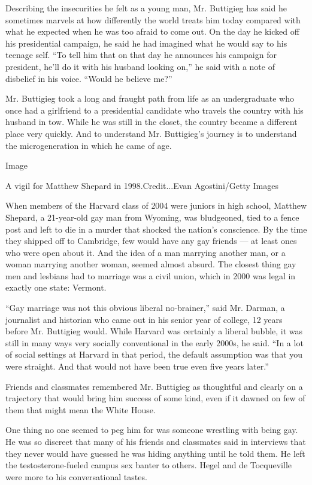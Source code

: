 Describing the insecurities he felt as a young man, Mr. Buttigieg has
said he sometimes marvels at how differently the world treats him today
compared with what he expected when he was too afraid to come out. On
the day he kicked off his presidential campaign, he said he had imagined
what he would say to his teenage self. ``To tell him that on that day he
announces his campaign for president, he'll do it with his husband
looking on,'' he said with a note of disbelief in his voice. ``Would he
believe me?''

Mr. Buttigieg took a long and fraught path from life as an undergraduate
who once had a girlfriend to a presidential candidate who travels the
country with his husband in tow. While he was still in the closet, the
country became a different place very quickly. And to understand Mr.
Buttigieg's journey is to understand the microgeneration in which he
came of age.

Image

A vigil for Matthew Shepard in 1998.Credit...Evan Agostini/Getty Images

When members of the Harvard class of 2004 were juniors in high school,
Matthew Shepard, a 21-year-old gay man from Wyoming, was bludgeoned,
tied to a fence post and left to die in a murder that shocked the
nation's conscience. By the time they shipped off to Cambridge, few
would have any gay friends --- at least ones who were open about it. And
the idea of a man marrying another man, or a woman marrying another
woman, seemed almost absurd. The closest thing gay men and lesbians had
to marriage was a civil union, which in 2000 was legal in exactly one
state: Vermont.

``Gay marriage was not this obvious liberal no-brainer,'' said Mr.
Darman, a journalist and historian who came out in his senior year of
college, 12 years before Mr. Buttigieg would. While Harvard was
certainly a liberal bubble, it was still in many ways very socially
conventional in the early 2000s, he said. ``In a lot of social settings
at Harvard in that period, the default assumption was that you were
straight. And that would not have been true even five years later.''

Friends and classmates remembered Mr. Buttigieg as thoughtful and
clearly on a trajectory that would bring him success of some kind, even
if it dawned on few of them that might mean the White House.

One thing no one seemed to peg him for was someone wrestling with being
gay. He was so discreet that many of his friends and classmates said in
interviews that they never would have guessed he was hiding anything
until he told them. He left the testosterone-fueled campus sex banter to
others. Hegel and de Tocqueville were more to his conversational tastes.

